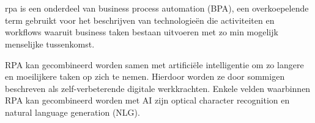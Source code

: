\chapter{}
\label{ch:stand-van-zaken}






\acrshort{rpa} is een onderdeel van business process automation (BPA), een overkoepelende term gebruikt voor het beschrijven van technologieën die activiteiten en workflows waaruit business taken bestaan uitvoeren met zo min mogelijk menselijke tussenkomst. \autocite{everythingRPA}

RPA kan gecombineerd worden samen met artificiële intelligentie om zo langere en moeilijkere taken op zich te nemen. Hierdoor worden ze door sommigen beschreven als zelf-verbeterende digitale werkkrachten. Enkele velden waarbinnen RPA kan gecombineerd worden met AI zijn optical character recognition en natural language generation (NLG). \autocite{everythingRPA}

